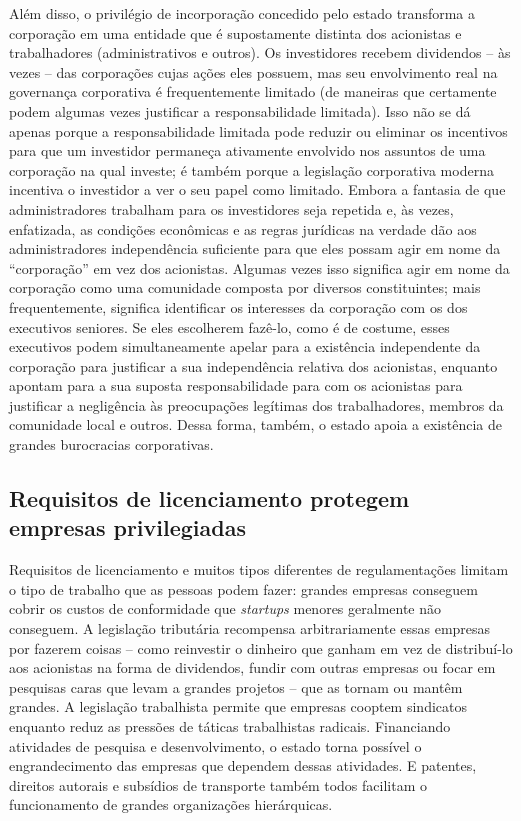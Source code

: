 Além disso, o privilégio de incorporação concedido pelo estado transforma a corporação em uma entidade que é supostamente distinta dos acionistas e trabalhadores (administrativos e outros). Os investidores recebem dividendos -- às vezes -- das corporações cujas ações eles possuem, mas seu envolvimento real na governança corporativa é frequentemente limitado (de maneiras que certamente podem algumas vezes justificar a responsabilidade limitada). Isso não se dá apenas porque a responsabilidade limitada pode reduzir ou eliminar os incentivos para que um investidor permaneça ativamente envolvido nos assuntos de uma corporação na qual investe; é também porque a legislação corporativa moderna incentiva o investidor a ver o seu papel como limitado. Embora a fantasia de que administradores trabalham para os investidores seja repetida e, às vezes, enfatizada, as condições econômicas e as regras jurídicas na verdade dão aos administradores independência suficiente para que eles possam agir em nome da ``corporação'' em vez dos acionistas. Algumas vezes isso significa agir em nome da corporação como uma comunidade composta por diversos constituintes; mais frequentemente, significa identificar os interesses da corporação com os dos executivos seniores. Se eles escolherem fazê-lo, como é de costume, esses executivos podem simultaneamente apelar para a existência independente da corporação para justificar a sua independência relativa dos acionistas, enquanto apontam para a sua suposta responsabilidade para com os acionistas para justificar a negligência às preocupações legítimas dos trabalhadores, membros da comunidade local e outros. Dessa forma, também, o estado apoia a existência de grandes burocracias corporativas.

\subsection*{Requisitos de licenciamento protegem empresas privilegiadas}

Requisitos de licenciamento e muitos tipos diferentes de regulamentações limitam o tipo de trabalho que as pessoas podem fazer: grandes empresas conseguem cobrir os custos de conformidade que \emph{startups} menores geralmente não conseguem. A legislação tributária recompensa arbitrariamente essas empresas por fazerem coisas -- como reinvestir o dinheiro que ganham em vez de distribuí-lo aos acionistas na forma de dividendos, fundir com outras empresas ou focar em pesquisas caras que levam a grandes projetos -- que as tornam ou mantêm grandes. A legislação trabalhista permite que empresas cooptem sindicatos enquanto reduz as pressões de táticas trabalhistas radicais. Financiando atividades de pesquisa e desenvolvimento, o estado torna possível o engrandecimento das empresas que dependem dessas atividades. E patentes, direitos autorais e subsídios de transporte também todos facilitam o funcionamento de grandes organizações hierárquicas.

